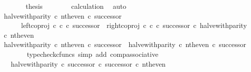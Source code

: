 \begin{isabellebody}
\ \ \ \ \isamarkupfalse%
\ \isamarkupfalse%
\ {\isacharquery}{\kern0pt}thesis\isanewline
\ \ \ \ \ \ \isamarkupfalse%
\ calculation\ \isamarkupfalse%
\ auto\isanewline
\ \ \isamarkupfalse%
\isanewline
\isanewline
\ \ \isamarkupfalse%
\ {\isachardoublequoteopen}{\isacharparenleft}{\kern0pt}halve{\isacharunderscore}{\kern0pt}with{\isacharunderscore}{\kern0pt}parity\ {\isasymcirc}\isactrlsub c\ nth{\isacharunderscore}{\kern0pt}even{\isacharparenright}{\kern0pt}\ {\isasymcirc}\isactrlsub c\ successor\ {\isacharequal}{\kern0pt}\isanewline
\ \ \ \ \ \ {\isacharparenleft}{\kern0pt}{\isacharparenleft}{\kern0pt}left{\isacharunderscore}{\kern0pt}coproj\ {\isasymnat}\isactrlsub c\ {\isasymnat}\isactrlsub c\ {\isasymcirc}\isactrlsub c\ successor{\isacharparenright}{\kern0pt}\ {\isasymamalg}\ {\isacharparenleft}{\kern0pt}right{\isacharunderscore}{\kern0pt}coproj\ {\isasymnat}\isactrlsub c\ {\isasymnat}\isactrlsub c\ {\isasymcirc}\isactrlsub c\ successor{\isacharparenright}{\kern0pt}{\isacharparenright}{\kern0pt}\ {\isasymcirc}\isactrlsub c\ halve{\isacharunderscore}{\kern0pt}with{\isacharunderscore}{\kern0pt}parity\ {\isasymcirc}\isactrlsub c\ nth{\isacharunderscore}{\kern0pt}even{\isachardoublequoteclose}\isanewline
\ \ \isamarkupfalse%
\ {\isacharminus}{\kern0pt}\isanewline
\ \ \ \ \isamarkupfalse%
\ {\isachardoublequoteopen}{\isacharparenleft}{\kern0pt}halve{\isacharunderscore}{\kern0pt}with{\isacharunderscore}{\kern0pt}parity\ {\isasymcirc}\isactrlsub c\ nth{\isacharunderscore}{\kern0pt}even{\isacharparenright}{\kern0pt}\ {\isasymcirc}\isactrlsub c\ successor\ {\isacharequal}{\kern0pt}\ halve{\isacharunderscore}{\kern0pt}with{\isacharunderscore}{\kern0pt}parity\ {\isasymcirc}\isactrlsub c\ nth{\isacharunderscore}{\kern0pt}even\ {\isasymcirc}\isactrlsub c\ successor{\isachardoublequoteclose}\isanewline
\ \ \ \ \ \ \isamarkupfalse%
\ {\isacharparenleft}{\kern0pt}typecheck{\isacharunderscore}{\kern0pt}cfuncs{\isacharcomma}{\kern0pt}\ simp\ add{\isacharcolon}{\kern0pt}\ comp{\isacharunderscore}{\kern0pt}associative{}{\isacharparenright}{\kern0pt}\isanewline
\ \ \ \ \isamarkupfalse%
\ \isamarkupfalse%
\ {\isachardoublequoteopen}{\isachardot}{\kern0pt}{\isachardot}{\kern0pt}{\isachardot}{\kern0pt}\ {\isacharequal}{\kern0pt}\ halve{\isacharunderscore}{\kern0pt}with{\isacharunderscore}{\kern0pt}parity\ {\isasymcirc}\isactrlsub c\ {\isacharparenleft}{\kern0pt}successor\ {\isasymcirc}\isactrlsub c\ successor{\isacharparenright}{\kern0pt}\ {\isasymcirc}\isactrlsub c\ nth{\isacharunderscore}{\kern0pt}even{\isachardoublequoteclose}\isanewline

\end{isabellebody}
